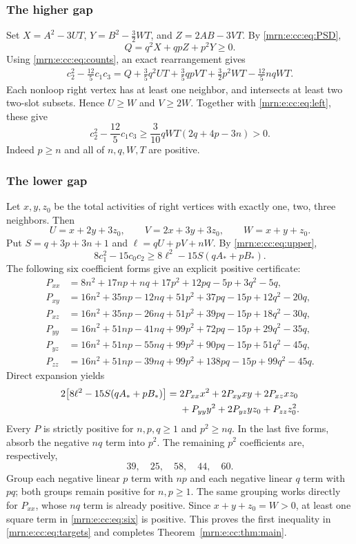 \documentclass[11pt,a4paper]{article}
\theoremstyle{remark}\newtheorem{remark}[theorem]{Remark}
\begin{document}
\subsubsection{The higher gap}
Set $X=A^2-3UT$, $Y=B^2-\frac32WT$, and $Z=2AB-3VT$. By \eqref{mrn:e:cc:eq:PSD},
\[
 Q=q^2X+qpZ+p^2Y\ge0.
\]
Using \eqref{mrn:e:cc:eq:counts}, an exact rearrangement gives
\begin{align*}
 c_2^2-\frac{12}{5}c_1c_3
 =Q+\frac35q^2UT+\frac35qpVT
       +\frac32p^2WT-\frac{12}{5}nqWT.
\end{align*}
Each nonloop right vertex has at least one neighbor, and intersects at least two two-slot subsets. Hence $U\ge W$ and $V\ge2W$. Together with \eqref{mrn:e:cc:eq:left}, these give
\begin{equation}\label{mrn:e:cc:eq:secondstrict}
 c_2^2-\frac{12}{5}c_1c_3
 \ge\frac3{10}qWT(2q+4p-3n)>0.
\end{equation}
Indeed $p\ge n$ and all of $n,q,W,T$ are positive.

\subsubsection{The lower gap}
Let $x,y,z_0$ be the total activities of right vertices with exactly one, two, three neighbors. Then
\[
 U=x+2y+3z_0,\qquad V=2x+3y+3z_0,\qquad W=x+y+z_0.
\]
Put $S=q+3p+3n+1$ and $\ell=qU+pV+nW$. By \eqref{mrn:e:cc:eq:upper},
\begin{equation}\label{mrn:e:cc:eq:firstlower}
 8c_1^2-15c_0c_2\ge8\ell^2-15S(qA_*+pB_*).
\end{equation}
The following six coefficient forms give an explicit positive certificate:
\begin{align*}
 P_{xx}&=8n^2+17np+nq+17p^2+12pq-5p+3q^2-5q,\\
 P_{xy}&=16n^2+35np-12nq+51p^2+37pq-15p+12q^2-20q,\\
 P_{xz}&=16n^2+35np-26nq+51p^2+39pq-15p+18q^2-30q,\\
 P_{yy}&=16n^2+51np-41nq+99p^2+72pq-15p+29q^2-35q,\\
 P_{yz}&=16n^2+51np-55nq+99p^2+90pq-15p+51q^2-45q,\\
 P_{zz}&=16n^2+51np-39nq+99p^2+138pq-15p+99q^2-45q.
\end{align*}
Direct expansion yields
\begin{align}\label{mrn:e:cc:eq:six}
 2\bigl[8\ell^2-15S(qA_*+pB_*)\bigr]
 ={}&2P_{xx}x^2+2P_{xy}xy+2P_{xz}xz_0\notag\\
 &+P_{yy}y^2+2P_{yz}yz_0+P_{zz}z_0^2.
\end{align}
Every $P$ is strictly positive for $n,p,q\ge1$ and $p^2\ge nq$. In the last five forms, absorb the negative $nq$ term into $p^2$. The remaining $p^2$ coefficients are, respectively,
\[
 39,\quad25,\quad58,\quad44,\quad60.
\]
Group each negative linear $p$ term with $np$ and each negative linear $q$ term with $pq$; both groups remain positive for $n,p\ge1$. The same grouping works directly for $P_{xx}$, whose $nq$ term is already positive. Since $x+y+z_0=W>0$, at least one square term in \eqref{mrn:e:cc:eq:six} is positive. This proves the first inequality in \eqref{mrn:e:cc:eq:targets} and completes Theorem~\ref{mrn:e:cc:thm:main}.
\end{document}
